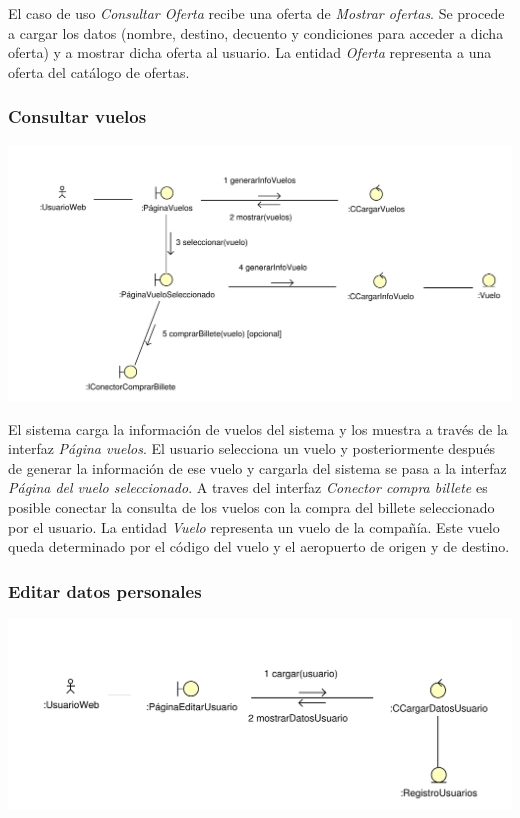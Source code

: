 \documentclass[11pt, a4paper, twoside, titlepage]{article}
\begin{document}
					El caso de uso {\itshape Consultar Oferta} recibe una oferta de {\itshape Mostrar ofertas}. Se procede a cargar los datos (nombre, destino, decuento y condiciones para acceder a dicha oferta) y a mostrar dicha oferta al usuario.
					La entidad {\itshape Oferta} representa a una oferta del catálogo de ofertas.

			\subsubsection{Consultar vuelos}
				\begin{center}
					\includegraphics[scale=.71]{analisis/diagramas/consultarvuelos.pdf}
				\end{center}
				
				El sistema carga la información de vuelos del sistema y los muestra a través de la interfaz {\itshape Página vuelos}. El usuario selecciona un vuelo y posteriormente después de generar la información de ese vuelo y cargarla del sistema se pasa a la interfaz {\itshape Página del vuelo seleccionado}. A traves del interfaz {\itshape Conector compra billete} es posible conectar la consulta de los vuelos con la compra del billete seleccionado por el usuario. 
				La entidad {\itshape Vuelo} representa un vuelo de la compañía. Este vuelo queda determinado por el código del vuelo y el aeropuerto de origen y de destino.
			
			\subsubsection{Editar datos personales}
				\begin{center}
					\includegraphics[scale=.86]{analisis/diagramas/editardatospersonales.pdf}
				\end{center}
					
\end{document}
